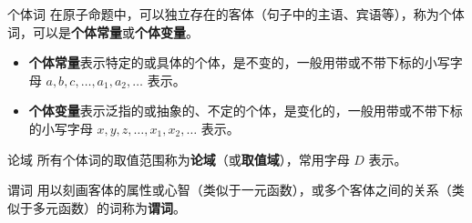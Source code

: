 

\begin{definition}{个体词}
在原子命题中，可以独立存在的客体（句子中的主语、宾语等），称为个体词，可以是\textbf{个体常量}或\textbf{个体变量}。
\begin{itemize}
\item \textbf{个体常量}表示特定的或具体的个体，是不变的，一般用带或不带下标的小写字母 $a, b, c, \dots, a_1, a_2, \dots$ 表示。
\item \textbf{个体变量}表示泛指的或抽象的、不定的个体，是变化的，一般用带或不带下标的小写字母 $x, y, z, \dots, x_1, x_2, \dots$ 表示。
\end{itemize}

\end{definition}
\begin{definition}{论域}
所有个体词的取值范围称为\textbf{论域}（或\textbf{取值域}），常用字母 $D$ 表示。
\end{definition}


\begin{definition}{谓词}
用以刻画客体的属性或心智（类似于一元函数），或多个客体之间的关系（类似于多元函数）的词称为\textbf{谓词}。
\end{definition}
